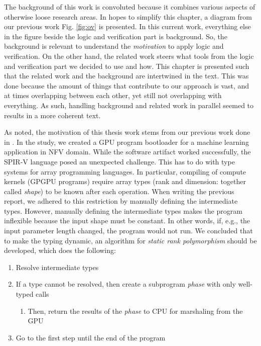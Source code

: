 \documentclass{report}
\begin{document}
The background of this work is convoluted because it combines various aspects of otherwise loose research areas. In hopes to simplify this chapter, a diagram from our previous work Fig. \ref{fig:ov} is presented. In this current work, everything else in the figure beside the logic and verification part is background. So, the background is relevant to understand the \emph{motivation} to apply logic and verification. On the other hand, the related work steers what tools from the logic and verification part we decided to use and how. This chapter is presented such that the related work and the background are intertwined in the text. This was done because the amount of things that contribute to our approach is vast, and at times overlapping between each other, yet still not overlapping with everything. As such, handling background and related work in parallel seemed to results in a more coherent text.

As noted, the motivation of this thesis work stems from our previous work done in \cite{gpupoly}. In the study, we created a GPU program bootloader for a machine learning application in \gls{NFV} domain. While the software artifact worked successfully, the SPIR-V language posed an unexpected challenge. This has to do with type systems for array programming languages. In particular, compiling of compute kernels (\gls{GPGPU} programs) require array types (rank and dimension: together called \emph{shape}) to be known after each operation. When writing the previous report, we adhered to this restriction by manually defining the intermediate types. However, manually defining the intermediate types makes the program inflexible because the input shape must be constant. In other words, if, e.g., the input parameter length changed, the program would not run. We concluded that to make the typing dynamic, an algorithm for \emph{static rank polymorphism} should be developed, which does the following:

\begin{enumerate}
    \item Resolve intermediate types
    \item If a type cannot be resolved, then create a subprogram \emph{phase} with only well-typed calls
    \begin{enumerate}
        \item Then, return the results of the \emph{phase} to CPU for marshaling from the GPU
    \end{enumerate}
    \item Go to the first step until the end of the program
\end{enumerate}
\end{document}
